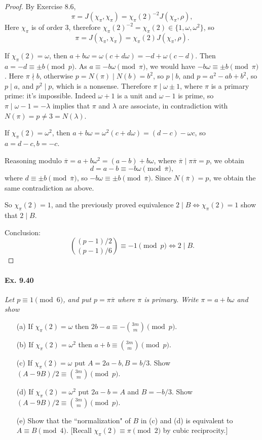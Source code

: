 \documentclass[11pt,a4paper]{article}
\begin{document}
\begin{proof}
By Exercise 8.6,
$$\pi = J(\chi_\pi,\chi_\pi) = \chi_\pi(2)^{-2} J (\chi_\pi,\rho),$$
Here $\chi_\pi$ is of order 3, therefore $\chi_\pi(2)^{-2} = \chi_\pi(2) \in \{1,\omega,\omega^2\}$, so
$$\pi = J(\chi_\pi,\chi_\pi) = \chi_\pi(2) J (\chi_\pi,\rho).$$

If $\chi_\pi(2) = \omega$, then $a+b\omega = \omega(c+d\omega) = -d + \omega(c-d)$. Then $a = -d \equiv \pm b \pmod p$. As $a \equiv -b\omega \pmod \pi$, we would have $-b\omega \equiv \pm b \pmod \pi$. Here $\pi \nmid b$,  otherwise $p = N(\pi) \mid N(b) = b^2$, so $p \mid b$, and $p =a^2 -ab +b^2$, so $p \mid a$, and $p^2 \mid p$, which is a nonsense. Therefore $\pi \mid \omega \pm 1$, where $\pi$ is a primary prime: it's impossible. Indeed $\omega + 1$ is a unit and $\omega - 1$ is prime, so $\pi \mid \omega - 1 = - \lambda$ implies that $\pi$ and $\lambda$ are associate, in contradiction with $N(\pi) = p \ne 3 = N(\lambda)$.

If $\chi_\pi(2) = \omega^2$, then $a+b\omega = \omega^2(c+d\omega) = (d-c) - \omega c$, so $a = d-c, b = -c$. 

Reasoning modulo $\overline{\pi} = a + b \omega^2 = (a-b) + b \omega$, where $\overline{\pi} \mid \pi \overline{\pi} =p$, we obtain
$$d = a-b \equiv -b \omega \pmod{\overline{\pi}},$$
where $d \equiv \pm b \pmod{\overline{\pi}}$, so $-b\omega \equiv \pm b\pmod{\overline{\pi}}$. Since $N(\overline{\pi}) = p$, we obtain the same contradiction as above.


So $\chi_\pi(2) = 1$, and the previously proved equivalence $2\mid B \iff \chi_\pi(2) = 1$ show that $2 \mid B$.

Conclusion: $$\binom{(p-1)/2}{(p-1)/6} \equiv -1 \pmod p \iff 2 \mid B.$$
\end{proof}

\paragraph{Ex. 9.40}
{\it Let $p\equiv 1 \pmod 6$, and put $p = \pi \overline{\pi}$ where $\pi$ is primary. Write $\pi = a + b\omega$ and show
\begin{enumerate}
\item[(a)] If $\chi_\pi(2) = \omega$ then $2b-a \equiv -\binom{3m}{m} \pmod p$.
\item[(b)] If $\chi_\pi(2) = \omega^2$ then $a+b \equiv \binom{3m}{m} \pmod p$.
\item[(c)] If $\chi_\pi(2) = \omega$ put $A=2a-b,B = b/3$. Show $(A-9B)/2 \equiv \binom{3m}{m} \pmod p$.
\item[(d)] If $\chi_\pi(2) = \omega^2$ put $2a-b = A$ and $B = -b/3$. Show $(A-9B)/2 \equiv \binom{3m}{m} \pmod p$.
\item[(e)] Show that the ``normalization" of $B$ in (c) and (d) is equivalent to $A \equiv B \pmod 4$.
[Recall $\chi_\pi(2) \equiv \pi \pmod 2$ by cubic reciprocity.]
\end{enumerate}
}
\end{document}
